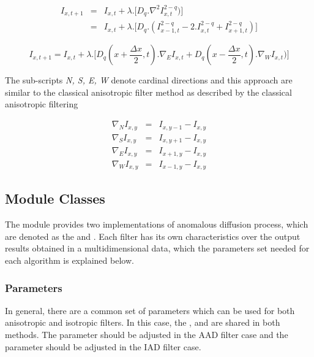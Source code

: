 \documentclass{InsightArticle}
\begin{document}
\begin{eqnarray}\label{Eq:IsoAnomNumericFormAnomalous}
 I_{x,t+1} &=& I_{x,t} + \lambda.\Big[ D_q. \nabla^2 I_{x,t}^{2 - q} )\Big] \nonumber \\
  &=& I_{x,t} + \lambda.\Big[ D_q. ( I_{x - 1,t}^{2 - q} - 2.I_{x,t}^{2 - q} + I_{x + 1,t}^{2 - q} )\Big]
\end{eqnarray}

\begin{equation}\label{Eq:AnisoAnomNumericFormAnomalous}
 I_{x,t+1} = I_{x,t} + \lambda.\Big[ D_q(x+\frac{\Delta x}{2},t) . \nabla_{E} I_{x,t} + D_q(x-\frac{\Delta x}{2},t). \nabla_{W} I_{x,t}) \Big]
\end{equation}

The sub-scripts \textit{N, S, E, W} denote cardinal directions and this approach are similar to the classical anisotropic filter method as described by the classical anisotropic filtering

\begin{eqnarray}\label{Eq:FiniteDiffGrad}
 \nabla_{N} I_{x,y} &=& I_{x,y - 1} - I_{x,y} \nonumber \\
 \nabla_{S} I_{x,y} &=& I_{x,y + 1} - I_{x,y} \nonumber \\
 \nabla_{E} I_{x,y} &=& I_{x + 1,y} - I_{x,y} \nonumber \\
 \nabla_{W} I_{x,y} &=& I_{x - 1,y} - I_{x,y}  
\end{eqnarray}

\subsection{Module Classes}

The  module provides two implementations of anomalous diffusion process, which are denoted as the  and . Each filter has its own characteristics over the output results obtained in a multidimensional data, which the parameters set needed for each algorithm is explained below.

\subsubsection{Parameters}\label{Sec:Parameters}

In general, there are a common set of parameters which can be used for both anisotropic and isotropic filters. In this case, the ,  and  are shared in both methods. The  parameter should be adjusted in the AAD filter case and the  parameter should be adjusted in the IAD filter case. 
\end{document}
